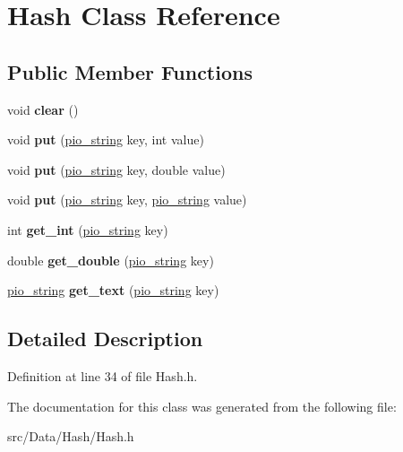 \hypertarget{class_hash}{
\section{Hash Class Reference}
\label{class_hash}
}
\subsection*{Public Member Functions}
\begin{DoxyCompactItemize}
\item 
\hypertarget{class_hash_a963f99b6362f2efcf2bcf6213a6c5841}{
void {\bfseries clear} ()}
\label{class_hash_a963f99b6362f2efcf2bcf6213a6c5841}

\item 
\hypertarget{class_hash_af1c4262d1f5e67665e3f98aabeb58ca4}{
void {\bfseries put} (\hyperlink{classpio__string}{pio\_\-string} key, int value)}
\label{class_hash_af1c4262d1f5e67665e3f98aabeb58ca4}

\item 
\hypertarget{class_hash_a7319a410c8c82661144a8d802034f270}{
void {\bfseries put} (\hyperlink{classpio__string}{pio\_\-string} key, double value)}
\label{class_hash_a7319a410c8c82661144a8d802034f270}

\item 
\hypertarget{class_hash_aa6c7b0ab0f5c54ea9501d1aa6f7edd31}{
void {\bfseries put} (\hyperlink{classpio__string}{pio\_\-string} key, \hyperlink{classpio__string}{pio\_\-string} value)}
\label{class_hash_aa6c7b0ab0f5c54ea9501d1aa6f7edd31}

\item 
\hypertarget{class_hash_a573e07025e60ff99dfb2135275589f11}{
int {\bfseries get\_\-int} (\hyperlink{classpio__string}{pio\_\-string} key)}
\label{class_hash_a573e07025e60ff99dfb2135275589f11}

\item 
\hypertarget{class_hash_a5949c5d318f8f2376de8af435a9d82d3}{
double {\bfseries get\_\-double} (\hyperlink{classpio__string}{pio\_\-string} key)}
\label{class_hash_a5949c5d318f8f2376de8af435a9d82d3}

\item 
\hypertarget{class_hash_a82ffe69d8ad1ad98656c2c5094660893}{
\hyperlink{classpio__string}{pio\_\-string} {\bfseries get\_\-text} (\hyperlink{classpio__string}{pio\_\-string} key)}
\label{class_hash_a82ffe69d8ad1ad98656c2c5094660893}

\end{DoxyCompactItemize}


\subsection{Detailed Description}


Definition at line 34 of file Hash.h.



The documentation for this class was generated from the following file:\begin{DoxyCompactItemize}
\item 
src/Data/Hash/Hash.h\end{DoxyCompactItemize}
